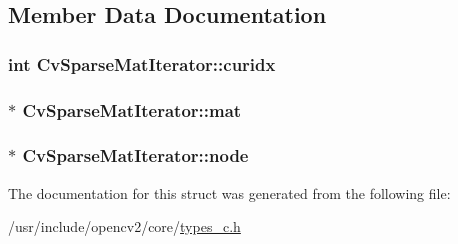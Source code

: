 \subsection{Member Data Documentation}
\hypertarget{structCvSparseMatIterator_a5501b26d2dc70d7ef55238a8e35e7abb}{
\subsubsection[{curidx}]{\setlength{\rightskip}{0pt plus 5cm}int Cv\-Sparse\-Mat\-Iterator\-::curidx}}\label{structCvSparseMatIterator_a5501b26d2dc70d7ef55238a8e35e7abb}
\hypertarget{structCvSparseMatIterator_a868331ed07ea23c10f3f3597e377221e}{
\subsubsection[{mat}]{$\ast$ Cv\-Sparse\-Mat\-Iterator\-::mat}}\label{structCvSparseMatIterator_a868331ed07ea23c10f3f3597e377221e}
\hypertarget{structCvSparseMatIterator_a4ee9bf194988e203fdb099992eff13c5}{
\subsubsection[{node}]{$\ast$ Cv\-Sparse\-Mat\-Iterator\-::node}}\label{structCvSparseMatIterator_a4ee9bf194988e203fdb099992eff13c5}


The documentation for this struct was generated from the following file\-:\begin{DoxyCompactItemize}
\item 
/usr/include/opencv2/core/\hyperlink{core_2types__c_8h}{types\-\_\-c.\-h}\end{DoxyCompactItemize}
